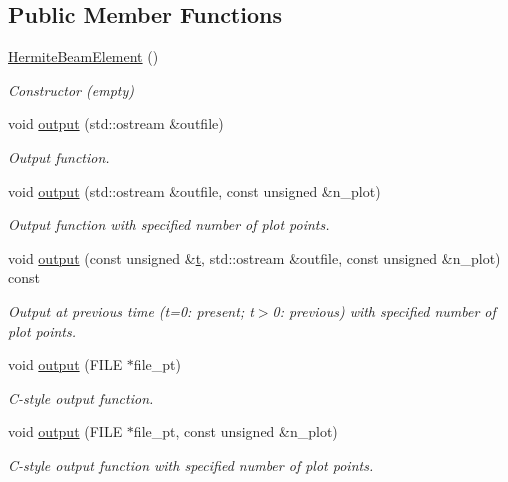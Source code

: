 \subsection*{Public Member Functions}
\begin{DoxyCompactItemize}
\item 
\hyperlink{classoomph_1_1HermiteBeamElement_a6671722e3e47b8ff355794f986642811}{Hermite\+Beam\+Element} ()
\begin{DoxyCompactList}\small\item\em Constructor (empty) \end{DoxyCompactList}\item 
void \hyperlink{classoomph_1_1HermiteBeamElement_a4e17bcc85c99e50a676998555151168a}{output} (std\+::ostream \&outfile)
\begin{DoxyCompactList}\small\item\em Output function. \end{DoxyCompactList}\item 
void \hyperlink{classoomph_1_1HermiteBeamElement_a57da5131fb8e21c6b4774f634492cbbf}{output} (std\+::ostream \&outfile, const unsigned \&n\+\_\+plot)
\begin{DoxyCompactList}\small\item\em Output function with specified number of plot points. \end{DoxyCompactList}\item 
void \hyperlink{classoomph_1_1HermiteBeamElement_aa86c489ad41bc0fb5d9ac3268883c826}{output} (const unsigned \&\hyperlink{cfortran_8h_af6f0bd3dc13317f895c91323c25c2b8f}{t}, std\+::ostream \&outfile, const unsigned \&n\+\_\+plot) const
\begin{DoxyCompactList}\small\item\em Output at previous time (t=0\+: present; t$>$0\+: previous) with specified number of plot points. \end{DoxyCompactList}\item 
void \hyperlink{classoomph_1_1HermiteBeamElement_ae47002ab30c8283faa9aebb4af9dc7f3}{output} (F\+I\+LE $\ast$file\+\_\+pt)
\begin{DoxyCompactList}\small\item\em C-\/style output function. \end{DoxyCompactList}\item 
void \hyperlink{classoomph_1_1HermiteBeamElement_a1507819b449418c5e27bb94a7fa08930}{output} (F\+I\+LE $\ast$file\+\_\+pt, const unsigned \&n\+\_\+plot)
\begin{DoxyCompactList}\small\item\em C-\/style output function with specified number of plot points. \end{DoxyCompactList}\item 

\end{DoxyCompactItemize}
